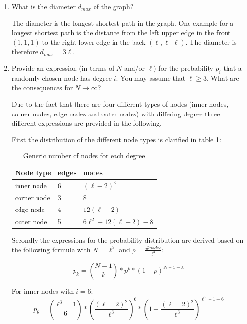 \begin{enumerate}
	\item What is the diameter $d_{max}$ of the graph?
	\vspace{0.25cm}
	
	The diameter is the longest shortest path in the graph. One example for a longest shortest path is the distance from the left upper edge in the front $(1,1,1)$ to the right lower edge in the back $(\ell,\ell,\ell)$. The diameter is therefore $d_{max} = 3\ell$.
	
	\item Provide an expression (in terms of $N$ and/or $\ell$) for the probability $p_i$ that a randomly chosen node has degree $i$. You may assume that $\ell \geq 3$. What are the consequences for $N \rightarrow \infty$?
	\vspace{0.25cm}
	
	Due to the fact that there are four different types of nodes (inner nodes, corner nodes, edge nodes and outer nodes) with differing degree three different expressions are provided in the following.
	
	First the distribution of the different node types is clarified in table \ref{tab:node_distribution}:
	
	\begin{table}[h]
	\centering
	\begin{tabular}{l|l|l}
		\hline
		\rowcolor{lightgray}
		Node type & edges & nodes \\ 
		\hline
		inner node    & 6 & $(\ell-2)^3$ \\
		\hline
		corner node    & 3 & $8$ \\
		\hline
		edge node    & 4  & $12(\ell - 2)$ \\
		\hline
		outer node    & 5  & $6\ell^2 - 12(\ell - 2) - 8$ \\
		\hline
	\end{tabular}
	\caption{Generic number of nodes for each degree}
	\label{tab:node_distribution}
	\end{table}

	Secondly the expressions for the probability distribution are derived based on the following formula with $N=\ell^3$ and $p=\frac{\#nodes}{\ell^3}$:
	
	\begin{equation*}
		p_k = {{N-1}\choose{k}} * p^k * (1-p)^{N-1-k}
	\end{equation*}
	
	For inner nodes with $i=6$:
	\begin{equation*}
		p_6 = {{\ell^3-1}\choose{6}} * (\frac{(\ell-2)^2}{\ell^3})^6 * (1-{\frac{(\ell-2)^2}{\ell^3}})^{\ell^3-1-6}
	\end{equation*}
	

\end{enumerate}
